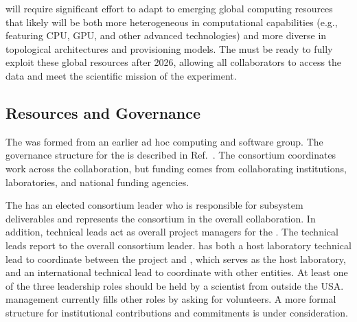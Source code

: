  will require significant effort to adapt to emerging  %
global computing resources that %
  likely will be both more heterogeneous in computational capabilities (e.g., featuring CPU, GPU, and other advanced technologies) and more diverse in topological architectures and provisioning models.  The   must %
be ready to fully exploit these global resources %
after 2026, allowing all collaborators to access the data and meet the scientific mission of the experiment.  

\subsection{Resources and Governance}
\label{sec:exec-comp-res}

The  was formed from an earlier ad hoc  computing and software group. %
The governance structure for the  is described in Ref.~\cite{bib:docdb12751}.  The consortium coordinates work across the collaboration, but funding comes from collaborating institutions, laboratories, and national funding agencies. %

The %
 has an elected consortium leader %
who is responsible for subsystem deliverables and represents the consortium in the overall  collaboration.
In addition, technical leads act as overall project managers for the . The technical leads report to the overall consortium leader.
 has both a host laboratory technical lead to coordinate between the  project and \fnal, which serves as the host laboratory, and an international technical lead to coordinate with other entities.
At least one of the three leadership roles should be held by a scientist from outside the USA. 
 management currently fills other roles by asking for volunteers.  A more formal structure for institutional contributions and commitments is under consideration. 

